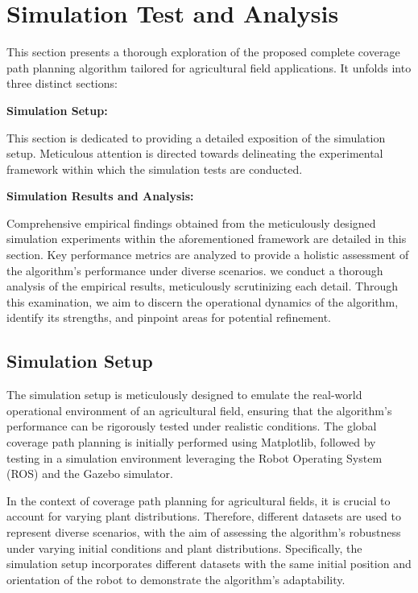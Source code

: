 
\section{Simulation Test and Analysis}


This section presents a thorough exploration of the proposed complete coverage path planning algorithm tailored for agricultural field applications. It unfolds into three distinct sections:

\vspace*{6mm}  

\textbf{Simulation Setup:}

This section is dedicated to providing a detailed exposition of the simulation setup. Meticulous attention is directed towards delineating the experimental framework within which the simulation tests are conducted.

\vspace*{6mm}  

\textbf{Simulation Results and Analysis:}

Comprehensive empirical findings obtained from the meticulously designed simulation experiments within the aforementioned framework are detailed in this section. Key performance metrics are analyzed to provide a holistic assessment of the algorithm's performance under diverse scenarios. we conduct a thorough analysis of the empirical results, meticulously scrutinizing each detail. Through this examination, we aim to discern the operational dynamics of the algorithm, identify its strengths, and pinpoint areas for potential refinement.
\vspace*{6mm}  

\subsection{Simulation Setup}


The simulation setup is meticulously designed to emulate the real-world operational environment of an agricultural field, ensuring that the algorithm's performance can be rigorously tested under realistic conditions. The global coverage path planning is initially performed using Matplotlib, followed by testing in a simulation environment leveraging the Robot Operating System (ROS) and the Gazebo simulator.

\vspace*{6mm}  

In the context of coverage path planning for agricultural fields, it is crucial to account for varying plant distributions. Therefore, different datasets are used to represent diverse scenarios, with the aim of assessing the algorithm's robustness under varying initial conditions and plant distributions. Specifically, the simulation setup incorporates different datasets with the same initial position and orientation of the robot to demonstrate the algorithm's adaptability.

